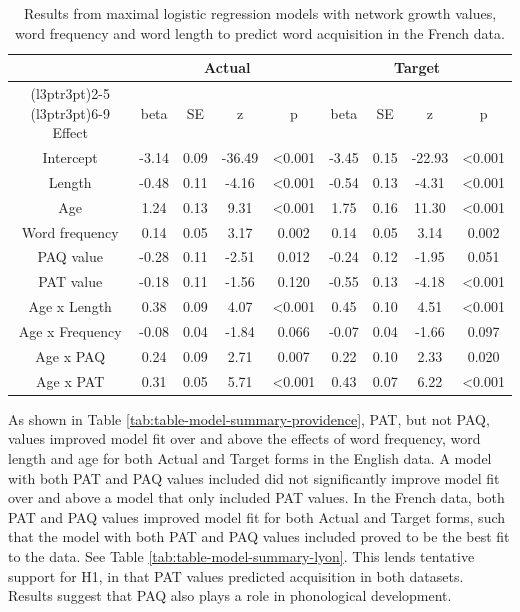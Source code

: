 \documentclass[
  english,
  man,floatsintext]{apa6}
\begin{document}
\begin{longtable}[t]{ccccccccc}
\caption{\label{tab:table-data-summary-lyon}Results from maximal logistic regression models with network growth values, word frequency and word length to predict word acquisition in the French data.}\\
\toprule
\multicolumn{1}{c}{ } & \multicolumn{4}{c}{Actual} & \multicolumn{4}{c}{Target} \\
\cmidrule(l{3pt}r{3pt}){2-5} \cmidrule(l{3pt}r{3pt}){6-9}
Effect & beta & SE & z & p & beta & SE & z & p\\
\midrule
Intercept & -3.14 & 0.09 & -36.49 & <0.001 & -3.45 & 0.15 & -22.93 & <0.001\\
Length & -0.48 & 0.11 & -4.16 & <0.001 & -0.54 & 0.13 & -4.31 & <0.001\\
Age & 1.24 & 0.13 & 9.31 & <0.001 & 1.75 & 0.16 & 11.30 & <0.001\\
Word frequency & 0.14 & 0.05 & 3.17 & 0.002 & 0.14 & 0.05 & 3.14 & 0.002\\
PAQ value & -0.28 & 0.11 & -2.51 & 0.012 & -0.24 & 0.12 & -1.95 & 0.051\\
\addlinespace
PAT value & -0.18 & 0.11 & -1.56 & 0.120 & -0.55 & 0.13 & -4.18 & <0.001\\
Age x Length & 0.38 & 0.09 & 4.07 & <0.001 & 0.45 & 0.10 & 4.51 & <0.001\\
Age x Frequency & -0.08 & 0.04 & -1.84 & 0.066 & -0.07 & 0.04 & -1.66 & 0.097\\
Age x PAQ & 0.24 & 0.09 & 2.71 & 0.007 & 0.22 & 0.10 & 2.33 & 0.020\\
Age x PAT & 0.31 & 0.05 & 5.71 & <0.001 & 0.43 & 0.07 & 6.22 & <0.001\\
\bottomrule
\end{longtable}

As shown in Table \ref{tab:table-model-summary-providence}, PAT, but not PAQ, values improved model fit over and above the effects of word frequency, word length and age for both Actual and Target forms in the English data. A model with both PAT and PAQ values included did not significantly improve model fit over and above a model that only included PAT values. In the French data, both PAT and PAQ values improved model fit for both Actual and Target forms, such that the model with both PAT and PAQ values included proved to be the best fit to the data. See Table \ref{tab:table-model-summary-lyon}. This lends tentative support for H1, in that PAT values predicted acquisition in both datasets. Results suggest that PAQ also plays a role in phonological development.
\end{document}

